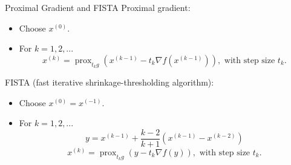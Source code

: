 \documentclass[xcolor=dvipsnames,t]{beamer} %
\begin{document}
\begin{frame}{Proximal Gradient and FISTA}
   Proximal gradient:\\
   \begin{itemize}
      \item Choose $x^{(0)}$.
      \item For $k=1,2,...$\\[-1em]

         \[ x^{(k)} = \operatorname{prox}_{t_k g}\left(x^{(k-1)} - t_k\nabla f(x^{(k-1)})\right), \text{ with step size $t_k$.} \] 
   \end{itemize} 

   FISTA (fast iterative shrinkage-thresholding algorithm):\\
   \begin{itemize}
      \item Choose $x^{(0)}=x^{(-1)}$.
      \item For $k=1,2,...$\\[-1em]
         \[ y = x^{(k-1)} + \dfrac{k-2}{k+1}\left(x^{(k-1)}-x^{(k-2)}\right) \] 
         \[ x^{(k)} = \operatorname{prox}_{t_kg}\left(y - t_k\nabla f(y)\right), \text{ with step size $t_k$.} \] 
   \end{itemize}

\end{frame}
\end{document}
